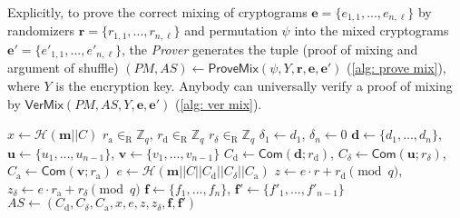 Explicitly, to prove the correct mixing of cryptograms $\boldsymbol{e} = \{ e_{1, 1}, ..., e_{n, \ell} \}$ by randomizers $\boldsymbol{r} = \{ r_{1, 1}, ..., r_{n, \ell} \}$ and permutation $\psi$ into the mixed cryptograms $\boldsymbol{e'} = \{ e'_{1, 1}, ..., e'_{n, \ell} \}$, the \textit{Prover} generates the tuple (proof of mixing and argument of shuffle) $(PM, AS) \gets \mathsf{ProveMix}(\psi, Y, \boldsymbol{r}, \boldsymbol{e}, \boldsymbol{e'})$ (\cref{alg: prove mix}), where $Y$ is the encryption key. Anybody can universally verify a proof of mixing by $\mathsf{VerMix}(PM, AS, Y, \boldsymbol{e}, \boldsymbol{e'})$ (\cref{alg: ver mix}).

\begin{algorithm}[ht]
    \DontPrintSemicolon
    \caption{$\mathsf{ProveASKC}(\psi; r; \boldsymbol{m}; C)$}
    \label{alg: prove askc}
    
    $x \gets \mathcal{H}(\boldsymbol{m} || C)$ \;
    $r_\mathrm{a} \in_\mathrm{R} \mathbb{Z}_q$, $r_\mathrm{d} \in_\mathrm{R} \mathbb{Z}_q$ $r_\delta \in_\mathrm{R} \mathbb{Z}_q$ \;
    $\delta_1 \gets d_1$, $\delta_n \gets 0$ \;
    $\boldsymbol{d} \gets \{ d_1, ..., d_n \}$, $\boldsymbol{u} \gets \{ u_1, ..., u_{n-1} \}$, $\boldsymbol{v} \gets \{ v_1, ..., v_{n-1} \}$ \;
    $C_\mathrm{d} \gets \mathsf{Com} (\boldsymbol{d}; r_\mathrm{d})$, $C_\delta \gets \mathsf{Com} (\boldsymbol{u}; r_\delta)$, $C_\mathrm{a} \gets \mathsf{Com} (\boldsymbol{v}; r_\mathrm{a})$ \;
    $e \gets \mathcal{H}(\boldsymbol{m} || C || C_\mathrm{d} || C_\delta || C_\mathrm{a})$ \;
    $z \gets e \cdot r + r_\mathrm{d} \pmod q$, $z_\delta \gets e \cdot r_\mathrm{a} + r_\delta \pmod q$ \;
    $\boldsymbol{f} \gets \{ f_1, ..., f_n \}$, $\boldsymbol{f'} \gets \{ f'_1, ..., f'_{n-1} \}$ \;
    $AS \gets (C_\mathrm{d}, C_\delta, C_\mathrm{a}, x, e, z, z_\delta, \boldsymbol{f}, \boldsymbol{f'})$ \;
     
\end{algorithm}

